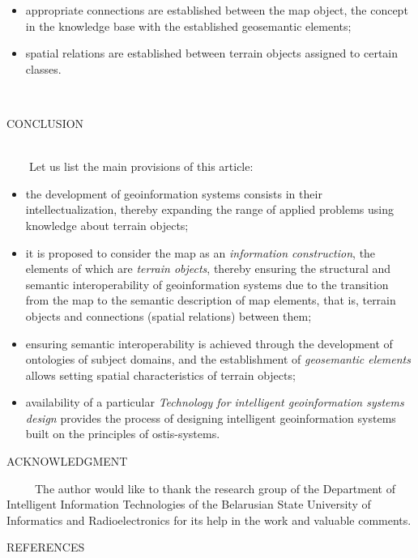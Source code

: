 \documentclass{article}
\begin{document}
\begin{multicols}{2}
\begin{itemize}
  \item appropriate connections are established between the
map object, the concept in the knowledge base with
the established geosemantic elements;
  \item spatial relations are established between terrain
objects assigned to certain classes.
 \end{itemize}\\
 
\begin{center}
 CONCLUSION
 \end{center}\\
 
\ \ \ \ Let us list the main provisions of this article:
\begin{itemize}
  \item  the development of geoinformation systems consists
in their intellectualization, thereby expanding the
range of applied problems using knowledge about
terrain objects;
  \item it is proposed to consider the map as an \textit{information
construction}, the elements of which are \textit{terrain
objects}, thereby ensuring the structural and semantic
interoperability of geoinformation systems due to the
transition from the map to the semantic description of
map elements, that is, terrain objects and connections
(spatial relations) between them;
  \item  ensuring semantic interoperability is achieved
through the development of ontologies of subject
domains, and the establishment of  \textit{geosemantic
elements} allows setting spatial characteristics of
terrain objects;
  \item availability of a particular  \textit{Technology for intelligent
geoinformation systems design} provides the process
of designing intelligent geoinformation systems built
on the principles of ostis-systems.
 \end{itemize}
\begin{center}
 ACKNOWLEDGMENT
 \end{center}
\ \ \ \  \ The author would like to thank the research group of
the Department of Intelligent Information Technologies
of the Belarusian State University of Informatics and
Radioelectronics for its help in the work and valuable
comments.
\begin{center}
 REFERENCES
 \end{center}
\begin{itemize}

\end{itemize}
\end{multicols}
\end{document}
